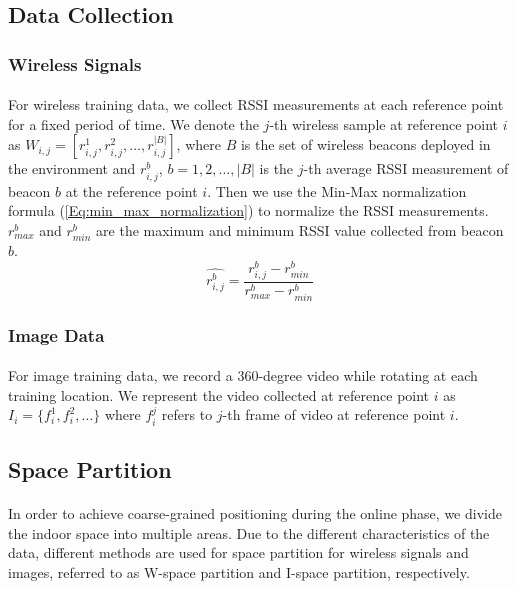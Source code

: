 \documentclass[a4paper,12pt]{report}
\begin{document}
\subsection{Data Collection}
\subsubsection{Wireless Signals}
\paragraph{}
For wireless training data, we collect RSSI measurements at each reference point for a fixed period of time. We denote the $j$-th wireless sample at reference point $i$ as $W_{i,j}=\left[ r_{i,j}^1,r_{i,j}^2,\ldots,r_{i,j}^{|B|} \right]$, where $B$ is the set of wireless beacons deployed in the environment and $r_{i,j}^b$, $b=1,2,\dots,|B|$ is the $j$-th average RSSI measurement of beacon $b$ at the reference point $i$. Then we use the Min-Max normalization formula (\ref{Eq:min_max_normalization}) to normalize the RSSI measurements. $r_{max}^b$ and $r_{min}^b$ are the maximum and minimum RSSI value collected from beacon $b$.
\begin{equation}
    \label{Eq:min_max_normalization}
    \hat{r_{i,j}^b}=\frac{r_{i,j}^b-r_{min}^b}{r_{max}^b-r_{min}^b}
\end{equation}

\subsubsection{Image Data}
\paragraph{}
For image training data, we record a 360-degree video while rotating at each training location. We represent the video collected at reference point $i$ as $I_i=\{f_i^1,f_i^2,\dots\}$ where $f_i^j$ refers to $j$-th frame of video at reference point $i$.
\subsection{Space Partition}
\paragraph{}
In order to achieve coarse-grained positioning during the online phase, we divide the indoor space into multiple areas. Due to the different characteristics of the data, different methods are used for space partition for wireless signals and images, referred to as W-space partition and I-space partition, respectively.
\end{document}

